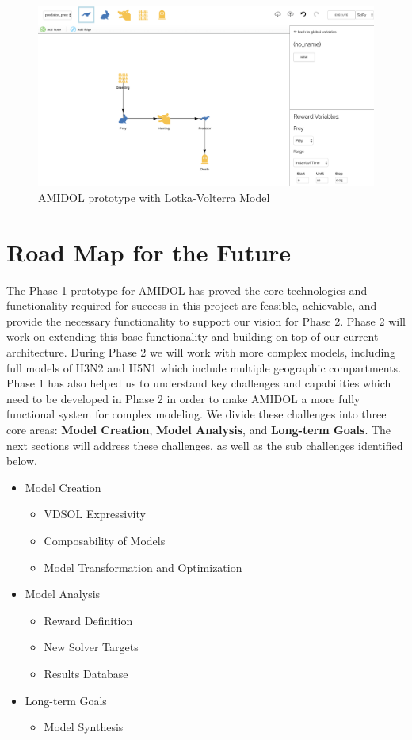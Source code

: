 \documentclass[11pt]{article}
\newcommand{\amidol}{\textsc{AMIDOL}}
\begin{document}
\begin{figure}
\includegraphics[width=\textwidth]{figs/Pred-Prey.png}
\caption{\amidol{} prototype with Lotka-Volterra Model}
\label{Fig:LV-Proto}
\end{figure}

\section{Road Map for the Future}

The Phase 1 prototype for \amidol{} has proved the core technologies
and functionality required for success in this project are feasible,
achievable, and provide the necessary functionality to support our
vision for Phase 2.  Phase 2 will work on extending this base
functionality and building on top of our current architecture.  During
Phase 2 we will work with more complex models, including full models
of H3N2 and H5N1 which include multiple geographic compartments.
Phase 1 has also helped us to understand key challenges and
capabilities which need to be developed in Phase 2 in order to make
\amidol{} a more fully functional system for complex modeling.  We
divide these challenges into three core areas: \textbf{Model
  Creation}, \textbf{Model Analysis}, and \textbf{Long-term Goals}.
The next sections will address these challenges, as well as the sub
challenges identified below.

\begin{itemize}
\item Model Creation
  \begin{itemize}
  \item VDSOL Expressivity
  \item Composability of Models
  \item Model Transformation and Optimization
  \end{itemize}
\item Model Analysis
  \begin{itemize}
  \item Reward Definition
  \item New Solver Targets
  \item Results Database
  \end{itemize}
\item Long-term Goals
  \begin{itemize}
  \item Model Synthesis
  \end{itemize}
\end{itemize}
\end{document}
